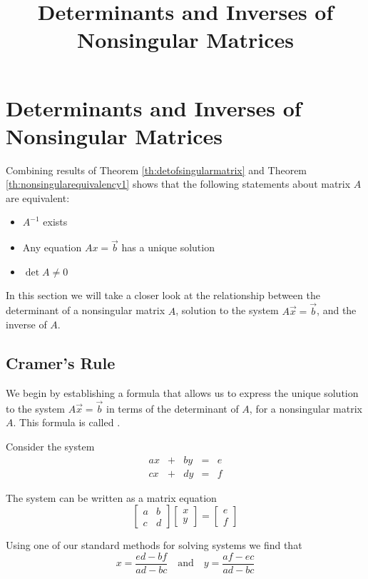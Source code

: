 \documentclass{ximera}
\title{Determinants and Inverses of Nonsingular Matrices} \license{CC BY-NC-SA 4.0}
\begin{document}
\begin{abstract}
 \end{abstract}
\maketitle

\section*{Determinants and Inverses of Nonsingular Matrices}

Combining results of Theorem \ref{th:detofsingularmatrix} and Theorem \ref{th:nonsingularequivalency1} shows that the following statements about matrix $A$ are equivalent:
\begin{itemize}
\item $A^{-1}$ exists
\item Any equation $Ax=\vec{b}$ has a unique solution
\item $\det{A}\neq 0$
\end{itemize}
In this section we will take a closer look at the relationship between the determinant of a nonsingular matrix $A$, solution to the system $A\vec{x}=\vec{b}$, and the inverse of $A$.  
\subsection*{Cramer's Rule}
We begin by establishing a formula that allows us to express the unique solution to the system $A\vec{x}=\vec{b}$ in terms of the determinant of $A$, for a nonsingular matrix $A$.  This formula is called .

Consider the system
$$\begin{array}{ccccc}
      ax& +&by&=&e\\
      cx & +&dy&= &f 
    \end{array}$$
    
 The system can be written as a matrix equation
 $$\begin{bmatrix}a&b\\c&d\end{bmatrix}\begin{bmatrix}x\\y\end{bmatrix}=\begin{bmatrix}e\\f\end{bmatrix}$$
 
 Using one of our standard methods for solving systems we find that 
 $$x=\frac{ed-bf}{ad-bc}\quad\text{and}\quad y=\frac{af-ec}{ad-bc}$$
 
\end{document}
